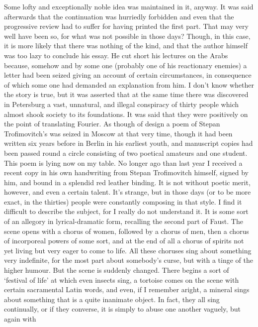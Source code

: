 \documentclass[12pt]{article}
\begin{document}
\vspace{12pt}
Some lofty and exceptionally noble idea was maintained in it, anyway.
It was said afterwards that the continuation was hurriedly forbidden and
even that the progressive review had to suffer for having printed the
first part. That may very well have been so, for what was not possible
in those days? Though, in this case, it is more likely that there
was nothing of the kind, and that the author himself was too lazy to
conclude his essay. He cut short his lectures on the Arabs because,
somehow and by some one (probably one of his reactionary enemies) a
letter had been seized giving an account of certain circumstances, in
consequence of which some one had demanded an explanation from him. I
don't know whether the story is true, but it was asserted that at the
same time there was discovered in Petersburg a vast, unnatural, and
illegal conspiracy of thirty people which almost shook society to its
foundations. It was said that they were positively on the point of
translating Fourier. As though of design a poem of Stepan Trofimovitch's
was seized in Moscow at that very time, though it had been written six
years before in Berlin in his earliest youth, and manuscript copies had
been passed round a circle consisting of two poetical amateurs and one
student. This poem is lying now on my table. No longer ago than last
year I received a recent copy in his own handwriting from Stepan
Trofimovitch himself, signed by him, and bound in a splendid red leather
binding. It is not without poetic merit, however, and even a certain
talent. It's strange, but in those days (or to be more exact, in the
thirties) people were constantly composing in that style. I find it
difficult to describe the subject, for I really do not understand it.
It is some sort of an allegory in lyrical-dramatic form, recalling the
second part of Faust. The scene opens with a chorus of women, followed
by a chorus of men, then a chorus of incorporeal powers of some sort,
and at the end of all a chorus of spirits not yet living but very
eager to come to life. All these choruses sing about something very
indefinite, for the most part about somebody's curse, but with a tinge
of the higher humour. But the scene is suddenly changed. There begins a
sort of `festival of life' at which even insects sing, a tortoise
comes on the scene with certain sacramental Latin words, and even, if
I remember aright, a mineral sings about something that is a quite
inanimate object. In fact, they all sing continually, or if they
converse, it is simply to abuse one another vaguely, but again with
\end{document}
